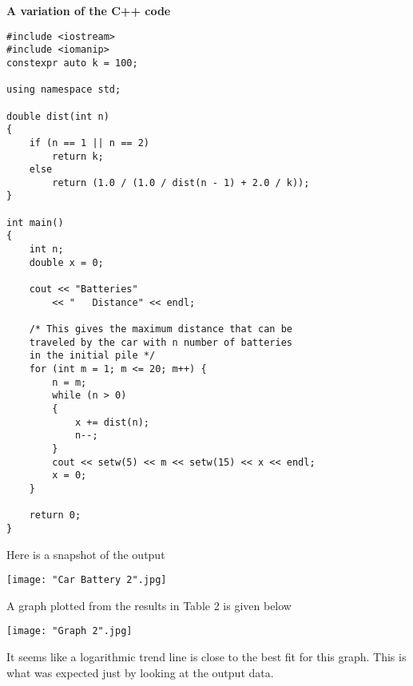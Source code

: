 \documentclass[a4paper, 12pt]{article}
\begin{document}
\textbf{A variation of the C++ code}
\begin{lstlisting}
#include <iostream>
#include <iomanip>
constexpr auto k = 100;

using namespace std;

double dist(int n)
{
	if (n == 1 || n == 2)
		return k;
	else
		return (1.0 / (1.0 / dist(n - 1) + 2.0 / k));
}

int main()
{
	int n;
	double x = 0;

	cout << "Batteries"
		<< "   Distance" << endl;
	
	/* This gives the maximum distance that can be
	traveled by the car with n number of batteries
	in the initial pile */
	for (int m = 1; m <= 20; m++) {
		n = m;
		while (n > 0)
		{
			x += dist(n);
			n--;
		}
		cout << setw(5) << m << setw(15) << x << endl;
		x = 0;
	}

	return 0;
}
\end{lstlisting}

\pagebreak
\begin{flushleft}
Here is a snapshot of the output
\begin{center}
	\texttt{[image: "Car Battery 2".jpg]}
\end{center}
A graph plotted from the results in Table 2 is given below
\begin{center}
	\texttt{[image: "Graph 2".jpg]}
\end{center}

It seems like a logarithmic trend line is close to the best fit for this graph. This is what was expected just by looking at the output data.
\end{flushleft}
\end{document}
